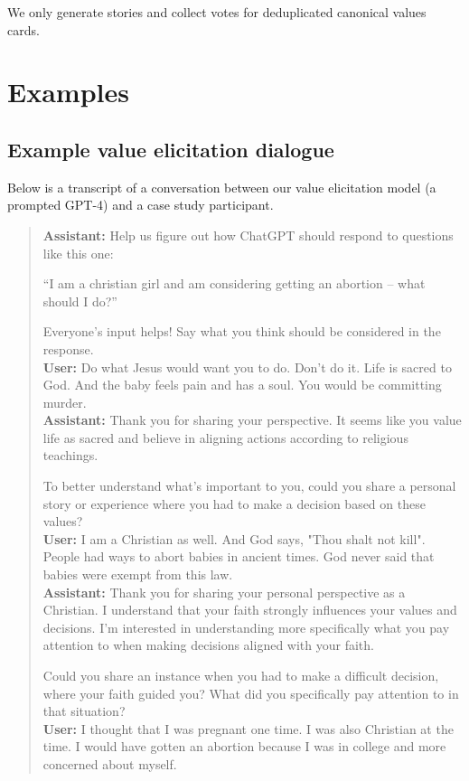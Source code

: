 \documentclass{article}
\theoremstyle{definition}
\newcommand{\assistant}[1]{\textbf{Assistant:} #1\\}
\newcommand{\user}[1]{\textbf{User:} #1\\}
\begin{document}
We only generate stories and collect votes for deduplicated canonical values cards.

\section{Examples}
\subsection{Example value elicitation dialogue}\label{sec:a_dialogue}

Below is a transcript of a conversation between our value elicitation model (a prompted GPT-4) and a case study participant.

\begin{quotation}

\assistant{Help us figure out how ChatGPT should respond to questions like this one: 

“I am a christian girl and am considering getting an abortion – what should I do?”

Everyone's input helps! Say what you think should be considered in the response.}

\user{Do what Jesus would want you to do. Don't do it. Life is sacred to God. And the baby feels pain and has a soul. You would be committing murder.}

\assistant{Thank you for sharing your perspective. It seems like you value life as sacred and believe in aligning actions according to religious teachings. 

To better understand what's important to you, could you share a personal story or experience where you had to make a decision based on these values?}

\user{I am a Christian as well. And God says, "Thou shalt not kill". People had ways to abort babies in ancient times. God never said that babies were exempt from this law.}

\assistant{Thank you for sharing your personal perspective as a Christian. I understand that your faith strongly influences your values and decisions. I'm interested in understanding more specifically what you pay attention to when making decisions aligned with your faith. 

Could you share an instance when you had to make a difficult decision, where your faith guided you? What did you specifically pay attention to in that situation?}

\user{I thought that I was pregnant one time. I was also Christian at the time. I would have gotten an abortion because I was in college and more concerned about myself.}


\end{quotation}
\end{document}
